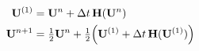 \documentclass[preview]{standalone}
\begin{document}
\begin{align*}
\special{dvisvgm:raw <g id='unique000'>}
            \begin{aligned}
            \mathbf{U}^{(1)} &= \mathbf{U}^n + \Delta t\, \mathbf{H}(\mathbf{U}^n) \\
            \mathbf{U}^{n+1} &= \tfrac{1}{2}\mathbf{U}^n + \tfrac{1}{2}\Big(\mathbf{U}^{(1)} + \Delta t\, \mathbf{H}(\mathbf{U}^{(1)})\Big)
            \end{aligned}
            \special{dvisvgm:raw </g>}
\end{align*}
\end{document}
